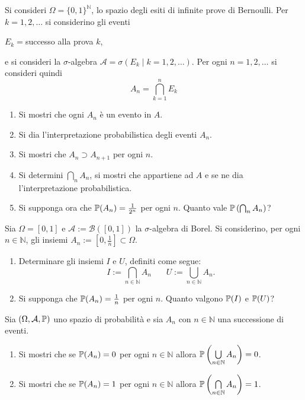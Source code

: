 Si consideri $\Omega =\{0,1\}^{\mathbb{N}}$, lo spazio degli esiti di infinite prove di Bernoulli. Per $k=1,2,\dots $ si considerino gli eventi
\begin{center}
$E_{k} =$successo alla prova $k$,
\end{center}
e si consideri la $\sigma $-algebra $\mathcal{A} =\sigma ( E_{k} \mid k=1,2,\dots )$. Per ogni $n=1,2,\dots $ si consideri quindi
\begin{equation*}
A_{n} =\bigcap _{k=1}^{n} E_{k}
\end{equation*}
\begin{enumerate}
\item Si mostri che ogni $A_{n}$ è un evento in $A$.
\item Si dia l'interpretazione probabilistica degli eventi $A_{n}$.
\item Si mostri che $A_{n} \supset A_{n+1}$ per ogni $n$.
\item Si determini $\bigcap _{n} A_{n}$, si mostri che appartiene ad $A$ e se ne dia l'interpretazione probabilistica.
\item Si supponga ora che $\P( A_{n}) =\frac{1}{2^{n}}$ per ogni $n$. Quanto vale $\P\left(\bigcap_{n} A_{n}\right)$?
\end{enumerate}
\Esercizio{}

Sia $\Omega =[ 0,1]$ e $\mathcal{A} :=\mathcal{B}([ 0,1])$ la $\sigma $-algebra di Borel. Si considerino, per ogni $n\in \mathbb{N}$, gli insiemi $A_{n} :=\left[ 0,\frac{1}{n}\right] \subset \Omega $.
\begin{enumerate}
\item Determinare gli insiemi $I$ e $U$, definiti come segue:\begin{equation*}
I:=\bigcap _{n\in \mathbb{N}} A_{n} \ \ \ \ \ \ \ \ U:=\bigcup _{n\in \mathbb{N}} A_{n} .
\end{equation*}
\item Si supponga che $\P( A_{n}) =\frac{1}{n}$ per ogni $n$. Quanto valgono $\P( I)$ e $\P( U)$?
\end{enumerate}
\Esercizio{$\star$}

Sia $( \Omega ,\mathcal{A} ,\P)$ uno spazio di probabilità e sia $A_{n}$ con $n\in \mathbb{N}$ una successione di eventi.
\begin{enumerate}
\item Si mostri che se $\P( A_{n}) =0$ per ogni $n\in \mathbb{N}$ allora $\P\left(\bigcup\limits _{n\in \mathbb{N}} A_{n}\right) =0$.
\item Si mostri che se $\P( A_{n}) =1$ per ogni $n\in \mathbb{N}$ allora $\P\left(\bigcap\limits _{n\in \mathbb{N}} A_{n}\right) =1$.
\end{enumerate}
\Esercizio{$\star$}


